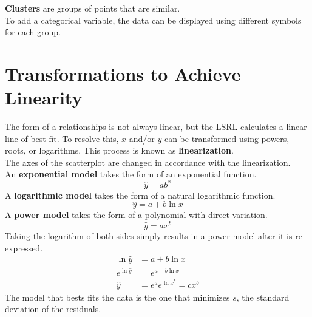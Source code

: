 \documentclass[../AP_Statistics.tex]{subfiles}
\begin{document}
			\textbf{Clusters} are groups of points that are similar. \\
			To add a categorical variable, the data can be displayed using different symbols for each group. \\
		\section{Transformations to Achieve Linearity}
			The form of a relationships is not always linear, but the LSRL calculates a linear line of best fit. To resolve this, $x$ and/or $y$ can be transformed using powers, roots, or logarithms. This process is known as \textbf{linearization}. \\
			The axes of the scatterplot are changed in accordance with the linearization. \\
			An \textbf{exponential model} takes the form of an exponential function.
			\[\hat{y} = ab^x\]
			A \textbf{logarithmic model} takes the form of a natural logarithmic function.
			\[\hat{y} = a + b\ln x\]
			A \textbf{power model} takes the form of a polynomial with direct variation.
			\[\hat{y} = ax^b\]
			Taking the logarithm of both sides simply results in a power model after it is re-expressed.
			\begin{align*}
				\ln \hat{y} &= a + b\ln x \\
				e^{\ln \hat{y}} &= e^{a + b\ln x} \\
				\hat{y} &= e^a e^{\ln x^b} = cx^b
			\end{align*}
			The model that bests fits the data is the one that minimizes $s$, the standard deviation of the residuals.
\end{document}
